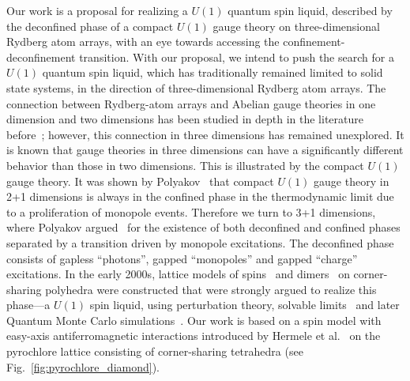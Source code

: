 \documentclass[twocolumn,superscriptaddress,amsmath,amssymb,aps,prx,nofootinbib]{revtex4-2}
\begin{document}
Our work is a proposal for realizing a $U(1)$ quantum spin liquid, described by the deconfined phase of a compact $U(1)$ gauge theory on three-dimensional Rydberg atom  arrays,  with an eye towards accessing the confinement-deconfinement transition. 
With our proposal, we intend to push the search for a $U(1)$ quantum spin liquid, which has traditionally remained limited to solid state systems, in the direction of three-dimensional Rydberg atom arrays.
The connection between Rydberg-atom arrays and Abelian gauge theories in one dimension and two dimensions has been studied in depth in the literature before~\cite{cheng2024emergent, ohler2022self, surace2020lattice, cheng2023gauge}; however, this connection in three dimensions has remained unexplored. It is known that gauge theories in three dimensions can have a significantly different behavior than those in two dimensions. This is illustrated by the compact $U(1)$ gauge theory.
It was shown by Polyakov~\cite{polyakovCompactGaugeFields1975,polyakov1977} that compact $U(1)$ gauge theory in 2+1 dimensions is always in the confined phase in the thermodynamic limit due to a proliferation of monopole events. Therefore we turn to 3+1 dimensions, where Polyakov argued~\cite{polyakov1977} for the existence of both deconfined and confined phases separated by a transition driven by monopole excitations. The deconfined phase consists of gapless ``photons'', gapped ``monopoles'' and gapped ``charge'' excitations. In the early 2000s, lattice models of spins~\cite{hermele2004} and dimers~\cite{huse2003} on corner-sharing polyhedra were constructed that were strongly argued to realize this phase---a $U(1)$ spin liquid, using perturbation theory, solvable limits~\cite{hermele2004} and later Quantum Monte Carlo simulations~\cite{banerjee2008,shannon2012}. Our work is based on a spin model with easy-axis antiferromagnetic interactions introduced by Hermele et al.~\cite{hermele2004} on the pyrochlore lattice consisting of corner-sharing tetrahedra (see Fig.~\ref{fig:pyrochlore_diamond}). 
\end{document}
